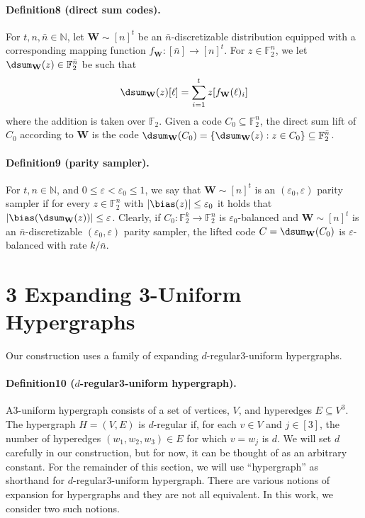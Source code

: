 \paragraph{Definition8 (direct sum codes).} For $t,n,\bar n\in\mathbb N$, let $\mathbf W\sim[n]^t$ be an $\bar n$-discretizable distribution equipped with a corresponding mapping function $f_{\mathbf W}:[\bar n]\to[n]^t$. For $z\in\mathbb F_2^n$, we let $\dsum_{\mathbf W}(z)\in\mathbb F_2^{\bar n}$ be such that
\[\dsum_{\mathbf W}(z)[\ell]=\sum_{i=1}^t z[f_{\mathbf W}(\ell)_i]\]
where the addition is taken over $\mathbb F_2$. Given a code $C_0\subseteq\mathbb F_2^n$, the direct sum lift of $C_0$ according to $\mathbf W$ is the code $\dsum_{\mathbf W}(C_0)=\{\dsum_{\mathbf W}(z):z\in C_0\}\subseteq\mathbb F_2^{\bar n}$.
\paragraph{Definition9 (parity sampler).} For $t,n\in\mathbb N$, and $0\leq\varepsilon<\varepsilon_0\leq1$, we say that $\mathbf W\sim[n]^t$ is an $(\varepsilon_0,\varepsilon)$ parity sampler if for every $z\in\mathbb F_2^n$ with $|\bias(z)|\leq\varepsilon_0$ it holds that $|\bias(\dsum_{\mathbf W}(z))|\leq\varepsilon$.
Clearly, if $C_0:\mathbb F_2^k\to\mathbb F_2^n$ is $\varepsilon_0$-balanced and $\mathbf W\sim[n]^t$ is an $\bar n$-discretizable $(\varepsilon_0,\varepsilon)$ parity sampler, the lifted code $C=\dsum_{\mathbf W}(C_0)$ is $\varepsilon$-balanced with rate $k/\bar n$.
\section*{3 Expanding 3-Uniform Hypergraphs}
Our construction uses a family of expanding $d$-regular3-uniform hypergraphs.
\paragraph{Definition10 ($d$-regular3-uniform hypergraph).} A3-uniform hypergraph consists of a set of vertices, $V$, and hyperedges $E\subseteq V^3$. The hypergraph $H=(V,E)$ is $d$-regular if, for each $v\in V$ and $j\in[3]$, the number of hyperedges $(w_1,w_2,w_3)\in E$ for which $v=w_j$ is $d$.
We will set $d$ carefully in our construction, but for now, it can be thought of as an arbitrary constant. For the remainder of this section, we will use ``hypergraph'' as shorthand for $d$-regular3-uniform hypergraph. There are various notions of expansion for hypergraphs and they are not all equivalent. In this work, we consider two such notions.
